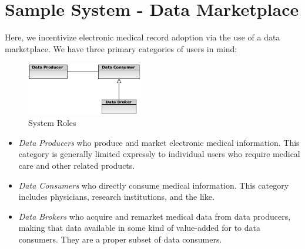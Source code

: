 \documentclass[10pt, conference, compsocconf]{IEEEtran}
\begin{document}
\section{Sample System - Data Marketplace}
Here, we incentivize electronic medical record adoption via the use of a data marketplace.  We have three primary categories of users in mind:

\begin{figure}[!t]
\centering
\includegraphics[width=2in]{roles}
\caption{System Roles}
\label{System Roles}
\end{figure}

\begin{itemize}
\item \textit{Data Producers} who produce and market electronic medical information.  This category is generally limited expressly to individual users who require medical care and other related products.
\item \textit{Data Consumers} who directly consume medical information.  This category includes physicians, research institutions, and the like.
\item \textit{Data Brokers} who acquire and remarket medical data from data producers, making that data available in some kind of value-added for to data consumers.  They are a proper subset of data consumers.
\end{itemize}
\end{document}
